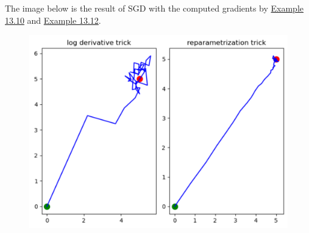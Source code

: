 \begin{example}
    The image below is the result of SGD with the computed gradients by \hyperref[example:13.10]{Example 13.10} and \hyperref[example:13.12]{Example 13.12}.

    \begin{figure}[H]
        \centering
        \includegraphics[width=1.0\textwidth]{.././assets/13.2.png}
    \end{figure}
\end{example}
